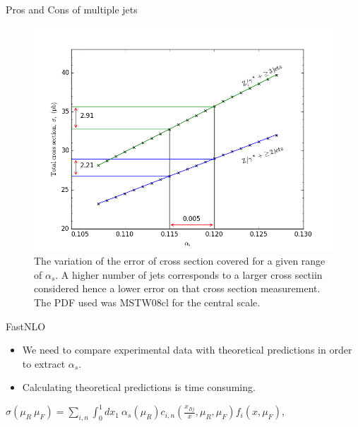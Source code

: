 \documentclass[14pt]{beamer}
\begin{document}
\begin{frame}[fragile]{Pros and Cons of multiple jets}
\begin{figure} 
	\begin{center}
		\includegraphics[width=0.7 \textwidth]{2jetvs3jet_totxsection.png}
		\caption{The variation of the error of cross section covered for a given range of ${\alpha_s}$. A higher number of jets corresponds to a larger cross sectiin considered hence a lower error on that cross section measurement. The PDF used was MSTW08cl for the central scale. }
		\label{2jetvs3jet
		}
	\end{center}
\end{figure}

\end{frame}

\begin{frame}[fragile]{FastNLO}
	\begin{itemize}
		\item We need to compare experimental data with theoretical predictions in order to extract ${\alpha_s}$. 
		\item Calculating theoretical predictions is time consuming.
		
	\end{itemize}
	
	{\renewcommand*{\normalfont}{\relax}
		\small
		\begin{center}
			\resizebox{0.85\textwidth}{!}
			{ 	
				${\sigma(\mu_R \ \mu_F) = \sum_{i,n} \int_{0}^{1}  dx_1 \ \alpha_s(\mu_R) c_{i,n} \left( \frac{x_{Bj}}{x}, \mu_R, \mu_F \right) f_i(x, \mu_F)}$,
			}
		\end{center}
	}	
\end{frame}	
\end{document}

